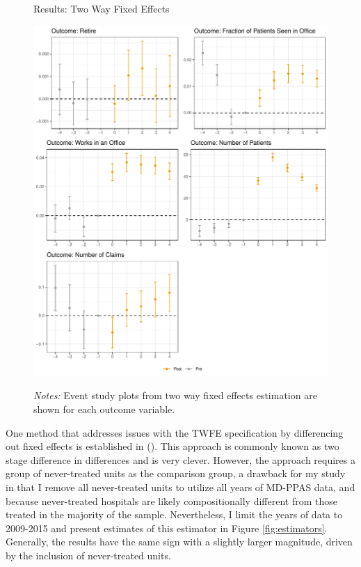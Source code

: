 \documentclass[12pt]{article}
\begin{document}
\begin{figure}
    \centering
    \captionsetup{width=.8\linewidth}
    \caption{Results: Two Way Fixed Effects}
    \includegraphics[scale=.8]{Objects/twfe_plot.pdf}
    \label{fig:twfe}
    \vspace{2mm}
    \caption*{\footnotesize{\textit{Notes:} Event study plots from two way fixed effects estimation are shown for each outcome variable.}}
\end{figure}

One method that addresses issues with the TWFE specification by differencing out fixed effects is established in \citeauthor{gardner2021two} (\citeyear{gardner2021two}). This approach is commonly known as two stage difference in differences and is very clever. However, the approach requires a group of never-treated units as the comparison group, a drawback for my study in that I remove all never-treated units to utilize all years of MD-PPAS data, and because never-treated hospitals are likely compositionally different from those treated in the majority of the sample. Nevertheless, I limit the years of data to 2009-2015 and present estimates of this estimator in Figure \ref{fig:estimators}. Generally, the results have the same sign with a slightly larger magnitude, driven by the inclusion of never-treated units. 
\end{document}
